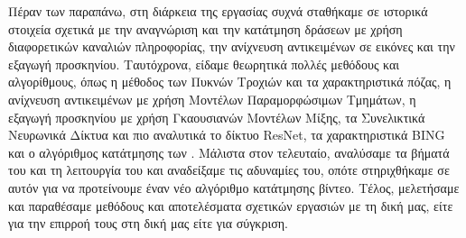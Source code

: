\documentclass[11pt,a4paper,english,greek,twoside]{../Thesis}
\begin{document}
\par Πέραν των παραπάνω, στη διάρκεια της εργασίας συχνά σταθήκαμε σε ιστορικά στοιχεία σχετικά με την αναγνώριση και την κατάτμηση δράσεων με χρήση διαφορετικών καναλιών πληροφορίας, την ανίχνευση αντικειμένων σε εικόνες και την εξαγωγή προσκηνίου. Ταυτόχρονα, είδαμε θεωρητικά πολλές μεθόδους και αλγορίθμους, όπως η μέθοδος των Πυκνών Τροχιών και τα χαρακτηριστικά πόζας, η ανίχνευση αντικειμένων με χρήση Μοντέλων Παραμορφώσιμων Τμημάτων, η εξαγωγή προσκηνίου με χρήση Γκαουσιανών Μοντέλων Μίξης, τα Συνελικτικά Νευρωνικά Δίκτυα και πιο αναλυτικά το δίκτυο ResNet, τα χαρακτηριστικά BING και ο αλγόριθμος κατάτμησης των \cite{hoai_2011}. Μάλιστα στον τελευταίο, αναλύσαμε τα βήματά του και τη λειτουργία του και αναδείξαμε τις αδυναμίες του, οπότε στηριχθήκαμε σε αυτόν για να προτείνουμε έναν νέο αλγόριθμο κατάτμησης βίντεο. Τέλος, μελετήσαμε και παραθέσαμε μεθόδους και αποτελέσματα σχετικών εργασιών με τη δική μας, είτε για την επιρροή τους στη δική μας είτε για σύγκριση.
\end{document}
